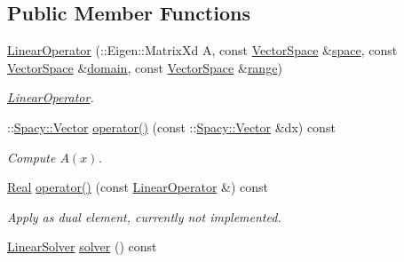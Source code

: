 \subsection*{\-Public \-Member \-Functions}
\begin{DoxyCompactItemize}
\item 
\hyperlink{classSpacy_1_1Rn_1_1LinearOperator_a5766be9cde54684c7318cc0f58fcda4c}{\-Linear\-Operator} (\-::\-Eigen\-::\-Matrix\-Xd \-A, const \hyperlink{classSpacy_1_1VectorSpace}{\-Vector\-Space} \&\hyperlink{classSpacy_1_1VectorBase_aa999dbf9d679d895dfe04c10fbf9f5e9}{space}, const \hyperlink{classSpacy_1_1VectorSpace}{\-Vector\-Space} \&\hyperlink{classSpacy_1_1OperatorBase_a2588f9b3e0188820c4c494e63293dc6f}{domain}, const \hyperlink{classSpacy_1_1VectorSpace}{\-Vector\-Space} \&\hyperlink{classSpacy_1_1OperatorBase_ab19d3b7a6f290b1079248f1e567e53d6}{range})
\begin{DoxyCompactList}\small\item\em \hyperlink{classSpacy_1_1Rn_1_1LinearOperator}{\-Linear\-Operator}. \end{DoxyCompactList}\item 
\hypertarget{classSpacy_1_1Rn_1_1LinearOperator_a804fce53cb8c2d1937fd0eae41718039}{\-::\hyperlink{classSpacy_1_1Vector}{\-Spacy\-::\-Vector} \hyperlink{classSpacy_1_1Rn_1_1LinearOperator_a804fce53cb8c2d1937fd0eae41718039}{operator()} (const \-::\hyperlink{classSpacy_1_1Vector}{\-Spacy\-::\-Vector} \&dx) const }\label{classSpacy_1_1Rn_1_1LinearOperator_a804fce53cb8c2d1937fd0eae41718039}

\begin{DoxyCompactList}\small\item\em \-Compute $A(x)$. \end{DoxyCompactList}\item 
\hypertarget{classSpacy_1_1Rn_1_1LinearOperator_aa10ed970cfb18e6eaedb890dd0308538}{\hyperlink{classSpacy_1_1Real}{\-Real} \hyperlink{classSpacy_1_1Rn_1_1LinearOperator_aa10ed970cfb18e6eaedb890dd0308538}{operator()} (const \hyperlink{classSpacy_1_1Rn_1_1LinearOperator}{\-Linear\-Operator} \&) const }\label{classSpacy_1_1Rn_1_1LinearOperator_aa10ed970cfb18e6eaedb890dd0308538}

\begin{DoxyCompactList}\small\item\em \-Apply as dual element, currently not implemented. \end{DoxyCompactList}\item 
\hypertarget{classSpacy_1_1Rn_1_1LinearOperator_a82989d016d28e2ae1fe5fa3d65df783d}{\hyperlink{classSpacy_1_1Rn_1_1LinearSolver}{\-Linear\-Solver} \hyperlink{classSpacy_1_1Rn_1_1LinearOperator_a82989d016d28e2ae1fe5fa3d65df783d}{solver} () const }\label{classSpacy_1_1Rn_1_1LinearOperator_a82989d016d28e2ae1fe5fa3d65df783d}


\end{DoxyCompactItemize}
